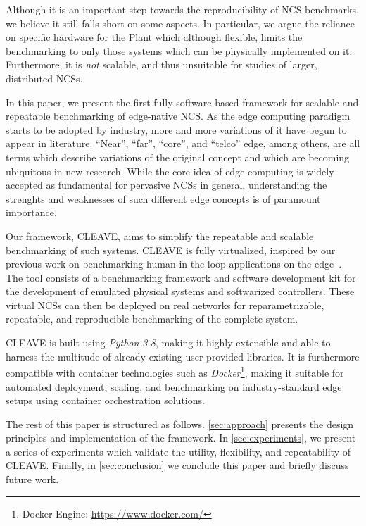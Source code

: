 Although it is an important step towards the reproducibility of \ac{NCS} benchmarks, we believe it still falls short on some aspects.
In particular, we argue the reliance on specific hardware for the Plant which although flexible, limits the benchmarking to only those systems which can be physically implemented on it.
Furthermore, it is \emph{not} scalable, and thus unsuitable for studies of larger, distributed \acp{NCS}.

In this paper, we present the first fully-software-based framework for scalable and repeatable benchmarking of edge-native \ac{NCS}.
As the edge computing paradigm starts to be adopted by industry, more and more variations of it have begun to appear in literature.
``Near'', ``far'', ``core'', and ``telco'' edge, among others, are all terms which describe variations of the original concept and which are becoming ubiquitous in new research.
While the core idea of edge computing is widely accepted as fundamental for pervasive \acp{NCS} in general, understanding the strenghts and weaknesses of such different edge concepts is of paramount importance.

Our framework, \ac{CLEAVE}, aims to simplify the repeatable and scalable benchmarking of such systems.
\ac{CLEAVE} is fully virtualized, inspired by our previous work on benchmarking human-in-the-loop applications on the edge~\cite{Olguin2019EdgeDroid}.
The tool consists of a benchmarking framework and software development kit for the development of emulated physical systems and softwarized controllers.
These virtual \acp{NCS} can then be deployed on real networks for reparametrizable, repeatable, and reproducible benchmarking of the complete system.

\ac{CLEAVE} is built using \emph{Python 3.8}, making it highly extensible and able to harness the multitude of already existing user-provided libraries.
It is furthermore compatible with container technologies such as \emph{Docker}\footnote{Docker Engine: \url{https://www.docker.com/}}, making it suitable for automated deployment, scaling, and benchmarking on industry-standard edge setups using container orchestration solutions.

The rest of this paper is structured as follows.
\cref{sec:approach} presents the design principles and implementation of the framework.
In \cref{sec:experiments}, we present a series of experiments which validate the utility, flexibility, and repeatability of \ac{CLEAVE}.
Finally, in \cref{sec:conclusion} we conclude this paper and briefly discuss future work.